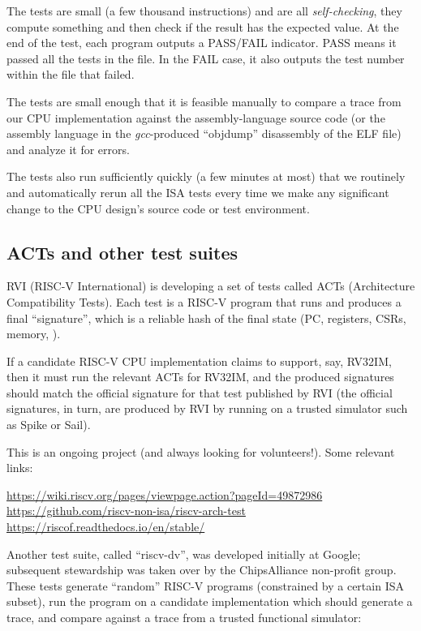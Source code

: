 The tests are small (a few thousand instructions) and are all
\emph{self-checking}, {\ie} they compute something and then check if
the result has the expected value.  At the end of the test, each
program outputs a PASS/FAIL indicator.  PASS means it passed all the
tests in the file. In the FAIL case, it also outputs the test number
within the file that failed.

The tests are small enough that it is feasible manually to compare a
trace from our CPU implementation against the assembly-language source
code (or the assembly language in the \emph{gcc}-produced ``objdump''
disassembly of the ELF file) and analyze it for errors.

The tests also run sufficiently quickly (a few minutes at most) that
we routinely and automatically rerun all the ISA tests every time we
make any significant change to the CPU design's source code or test
environment.


\subsection{ACTs and other test suites}

RVI (RISC-V International) is developing a set of tests called ACTs
(Architecture Compatibility Tests).  Each test is a RISC-V program
that runs and produces a final ``signature'', which is a reliable hash
of the final state (PC, registers, CSRs, memory, {\etc}).

If a candidate RISC-V CPU implementation claims to support, say,
RV32IM, then it must run the relevant ACTs for RV32IM, and the
produced signatures should match the official signature for that test
published by RVI (the official signatures, in turn, are produced by
RVI by running on a trusted simulator such as Spike or Sail).

This is an ongoing project (and always looking for volunteers!). Some
relevant links:

\begin{tabbing}
\hmm \= \url{https://wiki.riscv.org/pages/viewpage.action?pageId=49872986} \\
     \> \url{https://github.com/riscv-non-isa/riscv-arch-test} \\
     \> \url{https://riscof.readthedocs.io/en/stable/}
\end{tabbing}

Another test suite, called ``riscv-dv'', was developed initially at
Google; subsequent stewardship was taken over by the ChipsAlliance
non-profit group.  These tests generate ``random'' RISC-V programs
(constrained by a certain ISA subset), run the program on a candidate
implementation which should generate a trace, and compare against a
trace from a trusted functional simulator:

